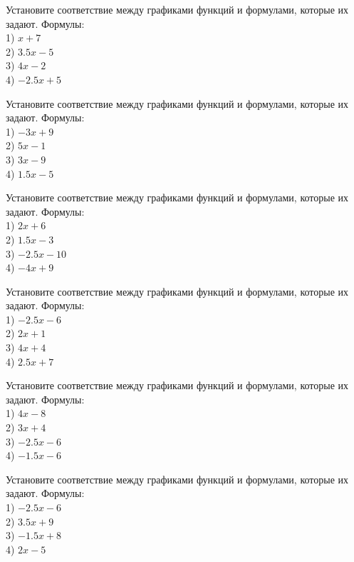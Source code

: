 \documentclass[4apaper]{article}
\begin{document}
\begin{taskBN}{25}
Установите соответствие между графиками функций и формулами, которые их задают. Формулы: \\1) $x+7$\\2) $3.5x-5$\\3) $4x-2$\\4) $-2.5x+5$
\end{taskBN}

\begin{taskBN}{26}
Установите соответствие между графиками функций и формулами, которые их задают. Формулы: \\1) $-3x+9$\\2) $5x-1$\\3) $3x-9$\\4) $1.5x-5$
\end{taskBN}

\begin{taskBN}{27}
Установите соответствие между графиками функций и формулами, которые их задают. Формулы: \\1) $2x+6$\\2) $1.5x-3$\\3) $-2.5x-10$\\4) $-4x+9$
\end{taskBN}

\begin{taskBN}{28}
Установите соответствие между графиками функций и формулами, которые их задают. Формулы: \\1) $-2.5x-6$\\2) $2x+1$\\3) $4x+4$\\4) $2.5x+7$
\end{taskBN}

\begin{taskBN}{29}
Установите соответствие между графиками функций и формулами, которые их задают. Формулы: \\1) $4x-8$\\2) $3x+4$\\3) $-2.5x-6$\\4) $-1.5x-6$
\end{taskBN}

\begin{taskBN}{30}
Установите соответствие между графиками функций и формулами, которые их задают. Формулы: \\1) $-2.5x-6$\\2) $3.5x+9$\\3) $-1.5x+8$\\4) $2x-5$
\end{taskBN}
\end{document}
